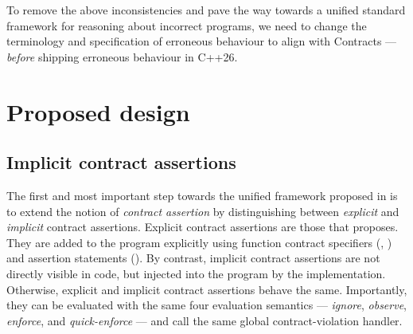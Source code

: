 To remove the above inconsistencies and pave the way towards a unified standard framework for reasoning about incorrect programs, we need to change the terminology and specification of erroneous behaviour to align with Contracts --- \emph{before} shipping erroneous behaviour in C++26.


\section{Proposed design}

\subsection{Implicit contract assertions}

The first  and most important step towards the unified framework proposed in \cite{P3100R1} is to extend the notion of \emph{contract assertion} by distinguishing between \emph{explicit} and \emph{implicit} contract assertions. Explicit contract assertions are those that \cite{P2900R13} proposes. They are added to the program explicitly using function contract specifiers (, ) and assertion statements (\mbox{}). By contrast, implicit contract assertions are not directly visible in code, but injected into the program by the implementation. Otherwise, explicit and implicit contract assertions behave the same. Importantly, they can be evaluated with the same four evaluation semantics --- \emph{ignore}, \emph{observe}, \emph{enforce}, and \emph{quick-enforce} --- and call the same global contract-violation handler. 

